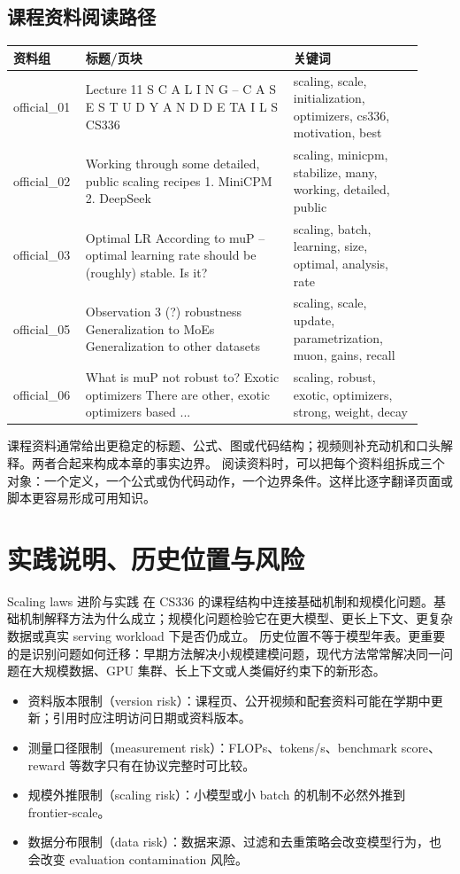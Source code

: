\documentclass[a4paper]{article}
\begin{document}
\subsection{课程资料阅读路径}
\begin{longtable}{p{0.14\linewidth}p{0.48\linewidth}p{0.30\linewidth}}
\toprule
\textbf{资料组} & \textbf{标题/页块} & \textbf{关键词}\\
\midrule
official\_01 & Lecture 11 S C A L I N G – C A S E S T U D Y A N D D E TA I L S CS336 & scaling, scale, initialization, optimizers, cs336, motivation, best\\
official\_02 & Working through some detailed, public scaling recipes 1. MiniCPM 2. DeepSeek & scaling, minicpm, stabilize, many, working, detailed, public\\
official\_03 & Optimal LR According to muP – optimal learning rate should be (roughly) stable. Is it? & scaling, batch, learning, size, optimal, analysis, rate\\
official\_05 & Observation 3 (?) robustness Generalization to MoEs Generalization to other datasets & scaling, scale, update, parametrization, muon, gains, recall\\
official\_06 & What is muP not robust to? Exotic optimizers There are other, exotic optimizers based ... & scaling, robust, exotic, optimizers, strong, weight, decay\\
\bottomrule
\end{longtable}
课程资料通常给出更稳定的标题、公式、图或代码结构；视频则补充动机和口头解释。两者合起来构成本章的事实边界。
阅读资料时，可以把每个资料组拆成三个对象：一个定义，一个公式或伪代码动作，一个边界条件。这样比逐字翻译页面或脚本更容易形成可用知识。
\section{实践说明、历史位置与风险}
Scaling laws 进阶与实践 在 CS336 的课程结构中连接基础机制和规模化问题。基础机制解释方法为什么成立；规模化问题检验它在更大模型、更长上下文、更复杂数据或真实 serving workload 下是否仍成立。
历史位置不等于模型年表。更重要的是识别问题如何迁移：早期方法解决小规模建模问题，现代方法常常解决同一问题在大规模数据、GPU 集群、长上下文或人类偏好约束下的新形态。
\begin{itemize}
\item 资料版本限制（version risk）：课程页、公开视频和配套资料可能在学期中更新；引用时应注明访问日期或资料版本。
\item 测量口径限制（measurement risk）：FLOPs、tokens/s、benchmark score、reward 等数字只有在协议完整时可比较。
\item 规模外推限制（scaling risk）：小模型或小 batch 的机制不必然外推到 frontier-scale。
\item 数据分布限制（data risk）：数据来源、过滤和去重策略会改变模型行为，也会改变 evaluation contamination 风险。
\end{itemize}
\end{document}
